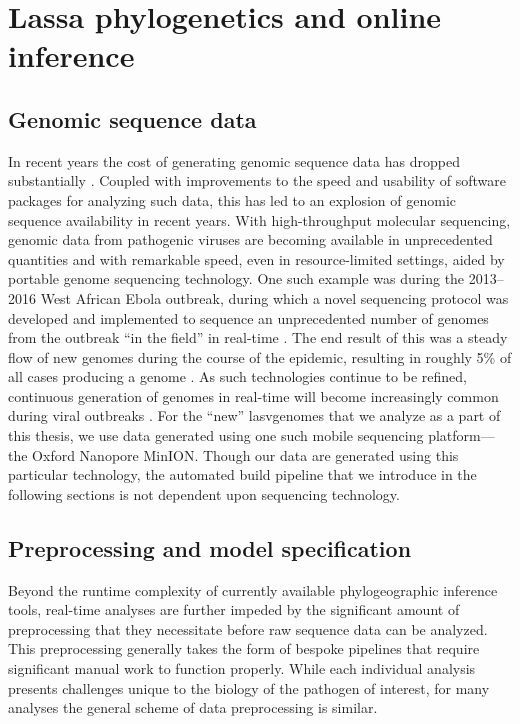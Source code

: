 \section{Lassa phylogenetics and online inference}

\subsection{Genomic sequence data}

In recent years the cost of generating genomic sequence data has dropped substantially \cite{sboner2011real}.
Coupled with improvements to the speed and usability of software packages for analyzing such data, this has led to an explosion of genomic sequence availability in recent years.
With high-throughput molecular sequencing, genomic data from pathogenic viruses are becoming available in unprecedented quantities and with remarkable speed, even in resource-limited settings, aided by portable genome sequencing technology.
One such example was during the 2013--2016 West African Ebola outbreak, during which a novel sequencing protocol was developed and implemented to sequence an unprecedented number of genomes from the outbreak ``in the field'' in real-time \cite{quick2016real}.
The end result of this was a steady flow of new genomes during the course of the epidemic, resulting in roughly 5\% of all cases producing a genome \cite{dudas2017virus}.
As such technologies continue to be refined, continuous generation of genomes in real-time will become increasingly common during viral outbreaks \cite{jain2016oxford}.
For the ``new'' \gls{lasv}genomes that we analyze as a part of this thesis, we use data generated using one such mobile sequencing platform---the Oxford Nanopore MinION.
Though our data are generated using this particular technology, the automated build pipeline that we introduce in the following sections is not dependent upon sequencing technology.

\subsection{Preprocessing and model specification}

Beyond the runtime complexity of currently available phylogeographic inference tools, real-time analyses are further impeded by the significant amount of preprocessing that they necessitate before raw sequence data can be analyzed. %
This preprocessing generally takes the form of bespoke pipelines that require significant manual work to function properly.
While each individual analysis presents challenges unique to the biology of the pathogen of interest, for many analyses the general scheme of data preprocessing is similar.

